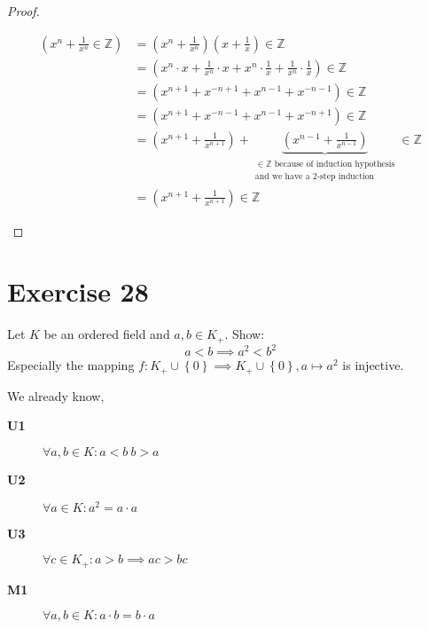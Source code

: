 \documentclass[a4paper]{article}
\theoremstyle{definition}
\newcommand\set[1]{\left\{#1\right\}}
\begin{document}
\begin{proof}
\begin{description}
      \begin{align*}
        \left(x^n + \frac1{x^n} \in \mathbb Z\right)
          &= \left(x^n + \frac1{x^n}\right)\left(x + \frac1x\right) \in \mathbb Z \\
          &= \left(x^n \cdot x + \frac1{x^n}\cdot x + x^n \cdot \frac1x + \frac1{x^n}\cdot \frac1x\right) \in \mathbb Z \\
          &= \left(x^{n+1} + x^{-n+1} + x^{n-1} + x^{-n-1}\right) \in \mathbb Z \\
          &= \left(x^{n+1} + x^{-n-1} + x^{n-1} + x^{-n+1}\right) \in \mathbb Z \\
          &= \left(x^{n+1} + \frac1{x^{n+1}}\right) + \underbrace{\left(x^{n-1} + \frac1{x^{n-1}}\right)}%
            _{\substack{\in \mathbb Z \text{ because of induction hypothesis} \\ \text{and we have a 2-step induction}}} \in \mathbb Z \\
          &= \left(x^{n+1} + \frac1{x^{n+1}}\right) \in \mathbb Z
      \end{align*}
  \end{description}
\end{proof}


\section{Exercise 28}
\begin{ex}
  Let $K$ be an ordered field and $a, b \in K_+$. Show:
  \[ a < b \implies a^2 < b^2 \]
  Especially the mapping $f: K_+ \cup \set{0} \implies K_+ \cup \set{0},
  a \mapsto a^2$ is injective.
\end{ex}

We already know,
\begin{description}
  \item[\textbf{U1}] $\forall a, b \in K: a < b \ b > a$
  \item[\textbf{U2}] $\forall a \in K: a^2 = a\cdot a$
  \item[\textbf{U3}] $\forall c \in K_+: a > b \implies ac > bc$
  \item[\textbf{M1}] $\forall a, b \in K: a \cdot b = b \cdot a$
\end{description}
\end{document}
